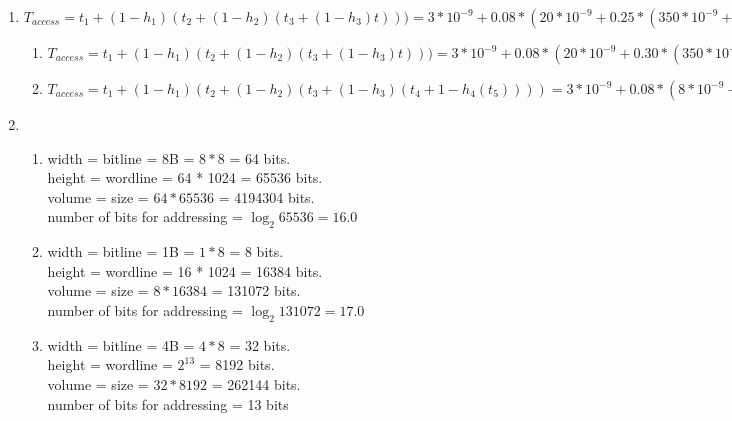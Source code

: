 \documentclass[12pt]{article}
\begin{document}
\begin{enumerate}
\begin{enumerate}
            \item
                Yes, when the time of retrieving data from the intermediate
                memories is more than the time of retrieving data from the main
                memory.
            \item
                Static memories are more expensive and have high speed because
                they don't need refreshing and less dense and they use less power.
                But Dynamic memories are chipper but they need refresher and so
                they are slower than static memories and they are denser than
                static memories and they use more power. - Using static memories
                is easier.
        \end{enumerate}
    \item

        $T_{access}=t_1+(1-h_1)(t_2+(1-h_2)(t_3+(1-h_3)t)))=
        3*10^{-9}+0.08*(20*10^{-9}+0.25*(350*10^{-9}+0.65*12*10^{-3}))=1.56*10^{-4} s$
        \begin{enumerate}
            \item
                $T_{access}=t_1+(1-h_1)(t_2+(1-h_2)(t_3+(1-h_3)t)))=
                3*10^{-9}+0.08*(20*10^{-9}+0.30*(350*10^{-9}+0.65*12*10^{-3}))=1.87213*10^{-4}$

            \item
                $T_{access}=t_1+(1-h_1)(t_2+(1-h_2)(t_3+(1-h_3)(t_4+1-h_4(t_5))))=
                3*10^{-9}+0.08*(8*10^{-9}+0.15*(20*10^{-9})+0.3*10^{-9}*350+0.65*
                10^{-3}*12)=6.24*10^{-4}$
        \end{enumerate}
    \item
        \begin{enumerate}
            \item
                width = bitline = 8B = $8*8$ = 64 bits.\\
                height = wordline = 64 * 1024 = 65536 bits.\\
                volume = size = $64*65536$ = 4194304 bits.\\
                number of bits for addressing = $\log_2{65536}=16.0$
            \item
                width = bitline = 1B = $1*8$ = 8 bits.\\
                height = wordline = 16 * 1024 = 16384 bits.\\
                volume = size = $8*16384$ = 131072 bits.\\
                number of bits for addressing = $\log_2{131072}=17.0$
            \item
                width = bitline = 4B = $4*8$ = 32 bits.\\
                height = wordline = $2^{13}$ = 8192 bits.\\
                volume = size = $32*8192$ = 262144 bits.\\
                number of bits for addressing = 13 bits\\

        \end{enumerate}

\end{enumerate}
\end{document}
